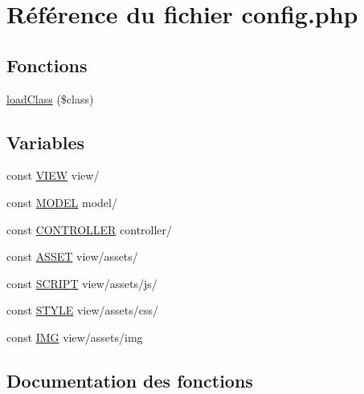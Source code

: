\hypertarget{config_8php}{}\section{Référence du fichier config.\+php}
\label{config_8php}
\subsection*{Fonctions}
\begin{DoxyCompactItemize}
\item 
\hyperlink{config_8php_a8326a997d0cfe76d80196f60d240d144_a8326a997d0cfe76d80196f60d240d144}{load\+Class} (\$class)
\end{DoxyCompactItemize}
\subsection*{Variables}
\begin{DoxyCompactItemize}
\item 
const \hyperlink{config_8php_aef7c7a92cfbdbb6c095d208691c9d872_aef7c7a92cfbdbb6c095d208691c9d872}{V\+I\+EW} \textquotesingle{}view/\textquotesingle{}
\item 
const \hyperlink{config_8php_a5b3f890200f757fae7f62a66f96a6f63_a5b3f890200f757fae7f62a66f96a6f63}{M\+O\+D\+EL} \textquotesingle{}model/\textquotesingle{}
\item 
const \hyperlink{config_8php_afa55a6839ec4ad32fc00879d78229356_afa55a6839ec4ad32fc00879d78229356}{C\+O\+N\+T\+R\+O\+L\+L\+ER} \textquotesingle{}controller/\textquotesingle{}
\item 
const \hyperlink{config_8php_a0a793564f75d8d8a378fe2cbb24a6c4c_a0a793564f75d8d8a378fe2cbb24a6c4c}{A\+S\+S\+ET} \textquotesingle{}view/assets/\textquotesingle{}
\item 
const \hyperlink{config_8php_ad9968be2511ce153149eb4050c77db15_ad9968be2511ce153149eb4050c77db15}{S\+C\+R\+I\+PT} \textquotesingle{}view/assets/js/\textquotesingle{}
\item 
const \hyperlink{config_8php_a2b837978f2db2667a52c5a7ec05d7e58_a2b837978f2db2667a52c5a7ec05d7e58}{S\+T\+Y\+LE} \textquotesingle{}view/assets/css/\textquotesingle{}
\item 
const \hyperlink{config_8php_a22490e314a272149d11cf7999def5abe_a22490e314a272149d11cf7999def5abe}{I\+MG} \textquotesingle{}view/assets/img\textquotesingle{}
\end{DoxyCompactItemize}


\subsection{Documentation des fonctions}
